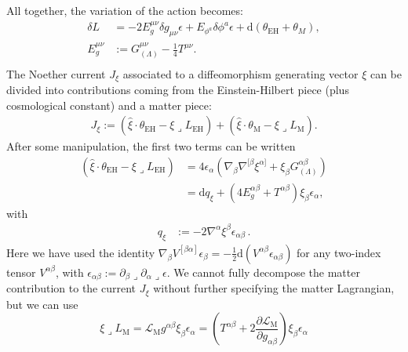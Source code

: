\documentclass[]{jkpaper}
\theoremstyle{plain}
\theoremstyle{definition}
\newcommand{\sins}{\mathop{\lrcorner}}
\newcommand{\sd}{\mathrm {d}}
\def\extd{\mathrm {d}}
\newcommand{\fd}{\delta}
\begin{document}
All together, the variation of the action becomes:
\begin{equation}\begin{split}
    \fd L&=
    -2E_{g}^{\mu\nu}\delta g_{\mu\nu}\epsilon+E_{\phi^a}\delta\phi^a\epsilon+\extd\left(\theta_{\text{EH}}+\theta_M\right),\\
    E_{g}^{\mu\nu}&:=G_{(\Lambda)}^{\mu\nu}-\frac{1}{4} T^{\mu\nu}.\\
\end{split}\end{equation}
The Noether current $J_\xi$ associated to a diffeomorphism generating vector $\xi$ can be divided into contributions coming from the Einstein-Hilbert piece (plus cosmological constant) and a matter piece:
\begin{equation}\begin{split}
    J_\xi:=\left(\hat{\xi}\cdot\theta_{\text{EH}} -\xi\sins L_{\text{EH}}\right)+ \left(\hat{\xi}\cdot\theta_{\text{M}} -\xi\sins L_{\text{M}}\right).
\end{split}\end{equation}
After some manipulation, the first two terms can be written
\begin{equation}\begin{split}
    \left(\hat{\xi}\cdot\theta_{\text{EH}} -\xi\sins L_{\text{EH}}\right)
    &=  4\epsilon_\alpha \left(\nabla_\beta \nabla^{[\beta}\xi^{\alpha]}+\xi_\beta G_{(\Lambda)}^{\alpha \beta}\right)\\
    &=  \sd q_\xi+ \left(4E_{g}^{\alpha\beta}+T^{\alpha\beta}\right)\xi_\beta\epsilon_\alpha,
\end{split}\end{equation}
with
\begin{equation}\begin{split}\label{eq: gravitational charge contribution}
    q_\xi&:=-2\nabla^{\alpha}\xi^\beta \epsilon_{\alpha\beta}\,.
\end{split}\end{equation}
Here we have used the identity $\nabla_\beta V^{[\beta\alpha]}\epsilon_\beta = -\frac{1}{2}\sd (V^{\alpha\beta}\epsilon_{\alpha\beta})$ for any two-index tensor $V^{\alpha\beta}$, with $\epsilon_{\alpha\beta}:=
    \partial_\beta\sins\partial_\alpha\sins \epsilon$.
We cannot fully decompose the matter contribution to the current $J_\xi$ without further specifying the matter Lagrangian, but we can use
\begin{equation}
\xi\sins L_{\text{M}}
=\mathcal{L}_{\text{M}}g^{\alpha\beta}\xi_\beta\epsilon_\alpha
=\left(T^{\alpha\beta}+2\frac{\partial \mathcal{L}_{\text{M}}}{\partial g_{\alpha\beta}}\right)\xi_\beta\epsilon_\alpha
\end{equation}
\end{document}
